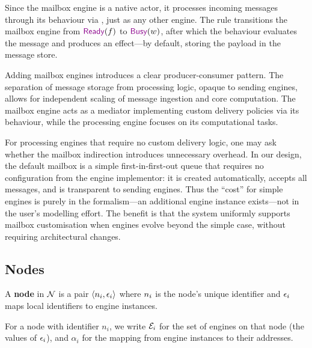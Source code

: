 \documentclass[
  a4paper,        %
  techreport,     %
]{art}
\begin{document}
Since the mailbox engine is a native actor, it processes incoming messages
through its behaviour via , just as any other engine.
The  rule transitions the mailbox engine from $\ready{f}$ to
$\busy{w}$, after which the behaviour evaluates the message and produces an
effect---by default, storing the payload in the message store.

Adding mailbox engines introduces a clear producer-consumer pattern. The
separation of message storage from processing logic, opaque to sending engines,
allows for independent scaling of message ingestion and core computation. The
mailbox engine acts as a mediator implementing custom delivery policies via its
behaviour, while the processing engine focuses on its computational tasks.

\begin{remark}\label{rem:mailbox-overhead}%
  For processing engines that require no custom delivery logic, one may ask
  whether the mailbox indirection introduces unnecessary overhead. In our
  design, the default mailbox is a simple first-in-first-out queue that
  requires no configuration from the engine implementor: it is created
  automatically, accepts all messages, and is transparent to sending engines.
  Thus the ``cost'' for simple engines is purely in the formalism---an
  additional engine instance exists---not in the user's modelling effort. The
  benefit is that the system uniformly supports mailbox customisation when
  engines evolve beyond the simple case, without requiring architectural
  changes.
\end{remark}



\subsection{Nodes}\label{sec:nodes}

\begin{definition}\label{def:node}%
A \textbf{node} in $\mathcal{N}$ is a pair
$ \langle n_i, \epsilon_i \rangle $ where $n_{i}$ is the node's
unique identifier and $\epsilon_i$ maps local identifiers to engine instances.
\end{definition}

For a node with identifier $n_i$, we write $\mathcal{E}_i$ for the set of
engines on that node (the values of $\epsilon_i$), and $\alpha_i$ for the
mapping from engine instances to their addresses.
\end{document}

